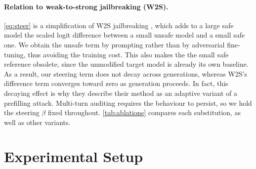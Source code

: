 \documentclass{article}
\begin{document}
\paragraph{Relation to weak-to-strong jailbreaking (W2S).}
\cref{eq:steer} is a simplification of W2S jailbreaking \citep{zhao2024weak}, which adds to a large safe model the scaled logit difference between a small unsafe model and a small safe one.
We obtain the unsafe term by prompting rather than by adversarial fine-tuning, thus avoiding the training cost. This also makes the the small safe reference obsolete, since the unmodified target model is already its own baseline.
As a result, our steering term does not decay across generations, whereas W2S's difference term converges toward zero as generation proceeds. In fact, this decaying effect is why they describe their method as an adaptive variant of a prefilling attack.
Multi-turn auditing requires the behaviour to persist, so we hold the steering $\beta$ fixed throughout.
\cref{tab:ablations} compares each substitution, as well as other variants.









\section{Experimental Setup}\label{sec:experiments}

\end{document}
